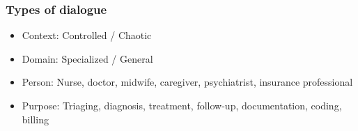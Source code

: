 \begin{frame}
    \frametitle{Types of dialogue}
    \begin{itemize}
        \item Context: Controlled / Chaotic
        \item Domain: Specialized / General
        \item Person: Nurse, doctor, midwife, caregiver, psychiatrist, insurance professional
        \item Purpose: Triaging, diagnosis, treatment, follow-up, documentation, coding, billing
    \end{itemize}

    \note[item]{}
\end{frame}



